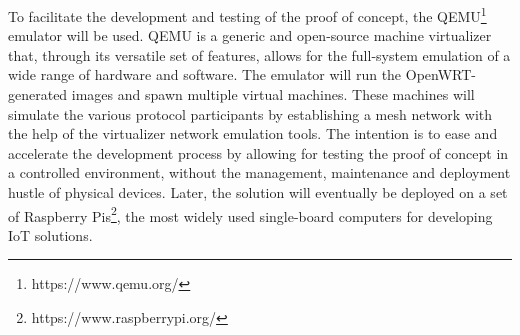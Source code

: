 To facilitate the development and testing of the proof of concept, the QEMU\footnote{https://www.qemu.org/} emulator will be used. QEMU is a generic and open-source machine virtualizer that, through its versatile set of features, allows for the full-system emulation of a wide range of hardware and software. The emulator will run the OpenWRT-generated images and spawn multiple virtual machines. These machines will simulate the various protocol participants by establishing a mesh network with the help of the virtualizer network emulation tools. The intention is to ease and accelerate the development process by allowing for testing the proof of concept in a controlled environment, without the management, maintenance and deployment hustle of physical devices. Later, the solution will eventually be deployed on a set of Raspberry Pis\footnote{https://www.raspberrypi.org/}, the most widely used single-board computers for developing IoT solutions.
